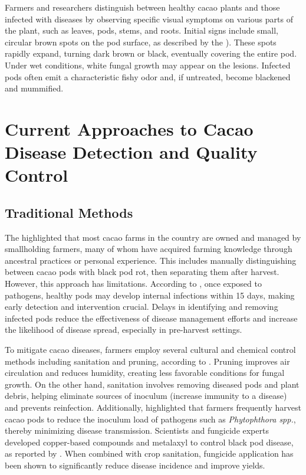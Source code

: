 Farmers and researchers distinguish between healthy cacao plants and those infected with diseases by observing specific visual symptoms on various parts of the plant, such as leaves, pods, stems, and roots. Initial signs include small, circular brown spots on the pod surface, as described by the \cite{MinistryAgri}). These spots rapidly expand, turning dark brown or black, eventually covering the entire pod. Under wet conditions, white fungal growth may appear on the lesions. Infected pods often emit a characteristic fishy odor and, if untreated, become blackened and mummified.

\section{Current Approaches to Cacao Disease Detection and Quality Control}
\subsection*{Traditional Methods}
The \cite{PhilCacaoRoadmap2021} highlighted that most cacao farms in the country are owned and managed by smallholding farmers, many of whom have acquired farming knowledge through ancestral practices or personal experience. This includes manually distinguishing between cacao pods with black pod rot, then separating them after harvest. However, this approach has limitations. According to \cite{ForestPhytophthora}, once exposed to pathogens, healthy pods may develop internal infections within 15 days, making early detection and intervention crucial. Delays in identifying and removing infected pods reduce the effectiveness of disease management efforts and increase the likelihood of disease spread, especially in pre-harvest settings.

To mitigate cacao diseases, farmers employ several cultural and chemical control methods including sanitation and pruning, according to \cite{AceboGuerrero2012}. Pruning improves air circulation and reduces humidity, creating less favorable conditions for fungal growth. On the other hand, sanitation involves removing diseased pods and plant debris, helping eliminate sources of inoculum (increase immunity to a disease) and prevents reinfection. Additionally, \cite{Merga2022} highlighted that farmers frequently harvest cacao pods to reduce the inoculum load of pathogens such as \textit{Phytophthora spp.}, thereby minimizing disease transmission. Scientists and fungicide experts developed copper-based compounds and metalaxyl to control black pod disease, as reported by \cite{Aneani2007}. When combined with crop sanitation, fungicide application has been shown to significantly reduce disease incidence and improve yields.

